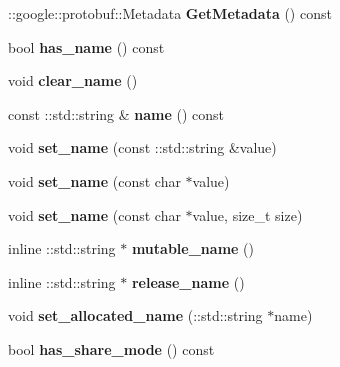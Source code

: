 \begin{DoxyCompactItemize}
\+::google\+::protobuf\+::\+Metadata {\bfseries Get\+Metadata} () const
\item 
\mbox{\label{classcaffe_1_1_param_spec_ad75e93a1fa6c266418fed6e177c58746}} 
bool {\bfseries has\+\_\+name} () const
\item 
\mbox{\label{classcaffe_1_1_param_spec_a39d5be1b3408e98351c2fc584902ba44}} 
void {\bfseries clear\+\_\+name} ()
\item 
\mbox{\label{classcaffe_1_1_param_spec_ad25b33cd27c88fe6044bd795dcf8ef1b}} 
const \+::std\+::string \& {\bfseries name} () const
\item 
\mbox{\label{classcaffe_1_1_param_spec_a2760508d3c08294c064c241a4455efd1}} 
void {\bfseries set\+\_\+name} (const \+::std\+::string \&value)
\item 
\mbox{\label{classcaffe_1_1_param_spec_a35529935f5ca86251fd304f77d397987}} 
void {\bfseries set\+\_\+name} (const char $\ast$value)
\item 
\mbox{\label{classcaffe_1_1_param_spec_a5c2b1349315db3e6d2beed2b960fd285}} 
void {\bfseries set\+\_\+name} (const char $\ast$value, size\+\_\+t size)
\item 
\mbox{\label{classcaffe_1_1_param_spec_afd872998e1a1ad7a983a38f840c6ccc9}} 
inline \+::std\+::string $\ast$ {\bfseries mutable\+\_\+name} ()
\item 
\mbox{\label{classcaffe_1_1_param_spec_a3178ba6d38f8a936e58032f4d1d16a80}} 
inline \+::std\+::string $\ast$ {\bfseries release\+\_\+name} ()
\item 
\mbox{\label{classcaffe_1_1_param_spec_a5e0b3042cdfbbc2ffaf22e4ca70cb742}} 
void {\bfseries set\+\_\+allocated\+\_\+name} (\+::std\+::string $\ast$name)
\item 
\mbox{\label{classcaffe_1_1_param_spec_a50b31ced024d904e5aa3f93449881e8e}} 
bool {\bfseries has\+\_\+share\+\_\+mode} () const

\end{DoxyCompactItemize}
